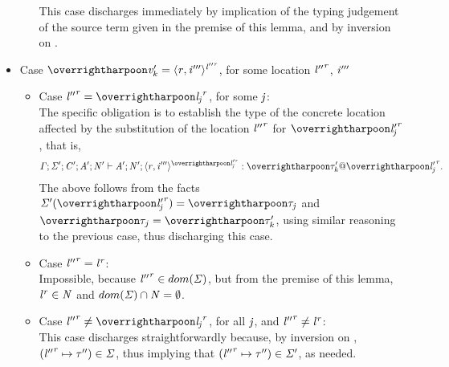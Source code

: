 \begin{nproof}
\begin{bcase}
\begin{itemize}
\begin{itemize}
        This case discharges immediately by implication of the typing judgement of the
        source term given in the premise of this lemma, and by inversion on \tvar{}.
      \end{itemize}
    \item Case $\overharpoon{\VAL'_k} = \concreteloc{\reg}{\ind'''}{\locreg{\loc''}{\reg}}$,
      for some location ${\mathit{l}''}^{\mathit{r}}$, $\mathit{i}'''$\\
      \begin{itemize}
      \item Case $\locreg{\loc''}{\reg} = \overharpoon{\locreg{\loc_{\indj}}{\reg}}$, for some
        $\mathit{j}$:\\
        The specific obligation is to establish the type of
        the concrete location affected by the substitution of the location ${\mathit{l}''}^{\mathit{r}}$
        for $\overharpoon{\locreg{\loc'_{\indj}}{\reg}}$, that is,
        \begin{displaymath}
        \TENV; \SENV'; \CENV'; \AENV'; \NENV' \vdash \AENV'; \NENV'; \concreteloc{\reg}{\ind'''}{\overharpoon{\locreg{\loc'_{\indj}}{\reg}}} : \overharpoon{\TYP'_k} \ensuremath{@} \overharpoon{\locreg{\loc'_j}{\reg}}.
        \end{displaymath}
        The above follows from the facts $\SENV'(\overharpoon{\locreg{\loc'_{\indj}}{\reg}}) = \overharpoon{\TYP_{\indj}}$
        and $\overharpoon{\TYP_j} = \overharpoon{\TYP'_k}$, using
        similar reasoning to the previous case, thus discharging this case.
      \item Case ${\mathit{l}''}^{\mathit{r}} = {\mathit{l}}^{\mathit{r}}$:\\
      Impossible, because ${\mathit{l}''}^{\mathit{r}} \in dom(\mathit{\Sigma})$, but from the premise of this lemma,
      ${\mathit{l}}^{\mathit{r}} \in \mathit{N}$ and $dom(\mathit{\Sigma}) \cap \mathit{N} = \emptyset$.
      \item Case $\locreg{\loc''}{\reg} \neq \overharpoon{\locreg{\loc_{\indj}}{\reg}}$, for all
        $\mathit{j}$, and ${\mathit{l}''}^{\mathit{r}} \neq {\mathit{l}}^{\mathit{r}}$:\\
        This case discharges straightforwardly because, by inversion on \tconcreteloc{},
        $({\mathit{l}''}^{\mathit{r}} \mapsto \mathit{\tau}'') \in \mathit{\Sigma}$, thus implying that
        $({\mathit{l}''}^{\mathit{r}} \mapsto \mathit{\tau}'') \in \mathit{\Sigma}'$,
        as needed.
      \end{itemize}
    \end{itemize}
  \end{bcase}


\end{nproof}
